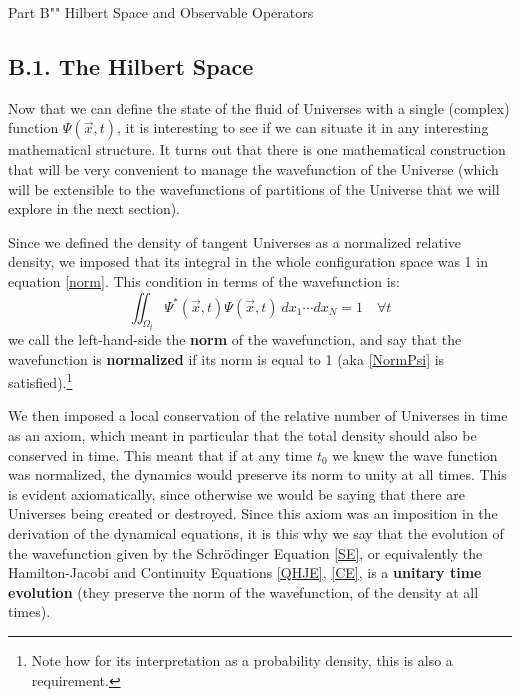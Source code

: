 \documentclass[11pt, a4paper]{article} %
\begin{document}
\newpage
{}
\newpage

\begin{kapituloBerria}{Part B}{""}
 Hilbert Space and Observable Operators 
\end{kapituloBerria}
\newpage
\fancyhead[L]{\null}
\fancyhead[R]{\null}
\null
\clearpage
{}



\subsection*{B.1. The Hilbert Space}

Now that we can define the state of the fluid of Universes with a single (complex) function $\Psi(\vec{x},t)$, it is interesting to see if we can situate it in any interesting mathematical structure. It turns out that there is one mathematical construction that will be very convenient to manage the wavefunction of the Universe (which will be extensible to the wavefunctions of partitions of the Universe that we will explore in the next section).

Since we defined the density of tangent Universes as a normalized relative density, we imposed that its integral in the whole configuration space was 1 in equation \eqref{norm}. This condition in terms of the wavefunction is:
\begin{equation}\label{NormPsi}
\iint_{\Omega_t}\Psi^*(\vec{x},t)\Psi(\vec{x},t)\ dx_1\cdots dx_N=1\quad \forall t
\end{equation}
we call the left-hand-side the {\bf norm} of the wavefunction, and say that the wavefunction is {\bf normalized} if its norm is equal to 1 (aka \eqref{NormPsi} is satisfied).\footnote{Note how for its interpretation as a probability density, this is also a requirement.}

We then imposed a local conservation of the relative number of Universes in time as an axiom, which meant in particular that the total density should also be conserved in time. This meant that if at any time $t_0$ we knew the wave function was normalized, the dynamics would preserve its norm to unity at all times. This is evident axiomatically, since otherwise we would be saying that there are Universes being created or destroyed. Since this axiom was an imposition in the derivation of the dynamical equations, it is this why we say that the evolution of the wavefunction given by the Schrödinger Equation \eqref{SE}, or equivalently the Hamilton-Jacobi and Continuity Equations \eqref{QHJE}, \eqref{CE}, is a {\bf unitary time evolution} (they preserve the norm of the wavefunction, of the density at all times).
\end{document}
